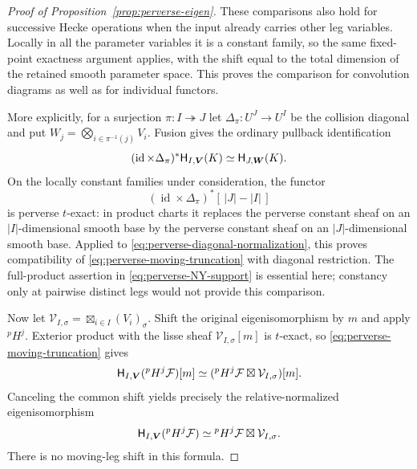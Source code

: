 \begin{proof}[Proof of Proposition~\ref{prop:perverse-eigen}]
These comparisons also hold for successive Hecke operations when
the input already carries other leg variables.  Locally in all
the parameter variables it is a constant family, so the same
fixed-point exactness argument applies, with the shift equal to
the total dimension of the retained smooth parameter space.
This proves the comparison for convolution diagrams as well as
for individual functors.

More explicitly, for a surjection $\pi:I\twoheadrightarrow J$ let
$\Delta_\pi:U^J\to U^I$ be the collision diagonal and put
$W_j=\bigotimes_{i\in\pi^{-1}(j)}V_i$.  Fusion gives the ordinary
pullback identification
\begin{equation}\label{eq:perverse-diagonal-normalization}
 (\operatorname{id}\times\Delta_\pi)^*
       \mathsf H_{I,\boldsymbol V}(K)
       \simeq \mathsf H_{J,\boldsymbol W}(K).
\end{equation}
On the locally constant families under consideration, the functor
\[
 (\operatorname{id}\times\Delta_\pi)^*[\,|J|-|I|\,]
\]
is perverse $t$-exact: in product charts it replaces the perverse
constant sheaf on an $|I|$-dimensional smooth base by the perverse
constant sheaf on an $|J|$-dimensional smooth base.  Applied to
\eqref{eq:perverse-diagonal-normalization}, this proves compatibility
of \eqref{eq:perverse-moving-truncation} with diagonal restriction.
The full-product assertion in \eqref{eq:perverse-NY-support} is
essential here; constancy only at pairwise distinct legs would
not provide this comparison.

Now let
$\mathcal V_{I,\sigma}=\boxtimes_{i\in I}(V_i)_\sigma$.
Shift the original eigenisomorphism by $m$ and apply ${}^pH^j$.
Exterior product with the lisse sheaf
$\mathcal V_{I,\sigma}[m]$ is $t$-exact, so
\eqref{eq:perverse-moving-truncation} gives
\[
 \mathsf H_{I,\boldsymbol V}({}^pH^j\mathcal F)[m]
   \simeq
 ({}^pH^j\mathcal F\boxtimes\mathcal V_{I,\sigma})[m].
\]
Canceling the common shift yields precisely the relative-normalized
eigenisomorphism
\begin{equation}\label{eq:perverse-induced-eigen}
 \mathsf H_{I,\boldsymbol V}({}^pH^j\mathcal F)
   \simeq {}^pH^j\mathcal F\boxtimes\mathcal V_{I,\sigma}.
\end{equation}
There is no moving-leg shift in this formula.


\end{proof}
